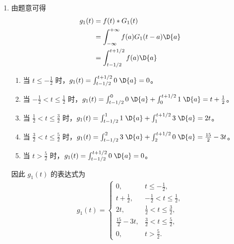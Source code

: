 \begin{solution}
    \begin{enumerate}[label=(\arabic*)]
        \item 由题意可得
            \begin{align*}
                g_1(t) & = f(t) * G_1(t) \\
                & = \int_{-\infty}^{+\infty}f(a)G_1(t - a)\D{a} \\
                & = \int_{t - 1/2}^{t + 1/2}f(a)\D{a}
            \end{align*}

            \begin{enumerate}
                \item 当 $t \le -\frac{1}{2}$ 时，$g_1(t) = \int_{t - 1/2}^{t + 1/2}0\;\D{a} = 0$。
                \item 当 $-\frac{1}{2} < t \le \frac{1}{2}$ 时，$g_1(t)
                    = \int_{t - 1/2}^{0}0\;\D{a} + \int_{0}^{t + 1/2}1\;\D{a}
                    = t + \frac{1}{2}$。
                \item 当 $\frac{1}{2} < t \le \frac{3}{2}$ 时，$g_1(t)
                    = \int_{t - 1/2}^{1}1\;\D{a} + \int_{1}^{t + 1/2}3\;\D{a}
                    = 2t$。
                \item 当 $\frac{3}{2} < t \le \frac{5}{2}$ 时，$g_1(t)
                    = \int_{t - 1/2}^{2}3\;\D{a} + \int_{2}^{t + 1/2}0\;\D{a}
                    = \frac{15}{2} - 3t$。
                \item 当 $t > \frac{5}{2}$ 时，$g_1(t) = \int_{t - 1/2}^{t + 1/2}0\;\D{a} = 0$。
            \end{enumerate}

            因此 $g_1(t)$ 的表达式为
            \begin{align*}
                g_1(t) = \begin{cases}
                    0, & t \le -\frac{1}{2}, \\
                    t + \frac{1}{2}, & -\frac{1}{2} < t \le \frac{1}{2}, \\
                    2t, & \frac{1}{2} < t \le \frac{3}{2}, \\
                    \frac{15}{2} - 3t, & \frac{3}{2} < t \le \frac{5}{2}, \\
                    0, & t > \frac{5}{2}.
                \end{cases}
            \end{align*}


\end{enumerate}
\end{solution}
